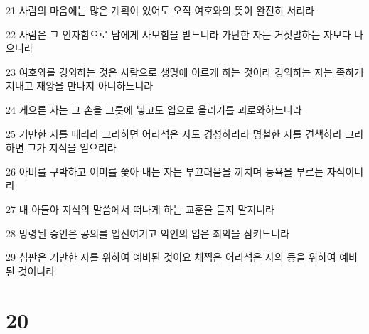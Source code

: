 \par 21 사람의 마음에는 많은 계획이 있어도 오직 여호와의 뜻이 완전히 서리라
\par 22 사람은 그 인자함으로 남에게 사모함을 받느니라 가난한 자는 거짓말하는 자보다 나으니라
\par 23 여호와를 경외하는 것은 사람으로 생명에 이르게 하는 것이라 경외하는 자는 족하게 지내고 재앙을 만나지 아니하느니라
\par 24 게으른 자는 그 손을 그릇에 넣고도 입으로 올리기를 괴로와하느니라
\par 25 거만한 자를 때리라 그리하면 어리석은 자도 경성하리라 명철한 자를 견책하라 그리하면 그가 지식을 얻으리라
\par 26 아비를 구박하고 어미를 쫓아 내는 자는 부끄러움을 끼치며 능욕을 부르는 자식이니라
\par 27 내 아들아 지식의 말씀에서 떠나게 하는 교훈을 듣지 말지니라
\par 28 망령된 증인은 공의를 업신여기고 악인의 입은 죄악을 삼키느니라
\par 29 심판은 거만한 자를 위하여 예비된 것이요 채찍은 어리석은 자의 등을 위하여 예비된 것이니라

\chapter{20}

